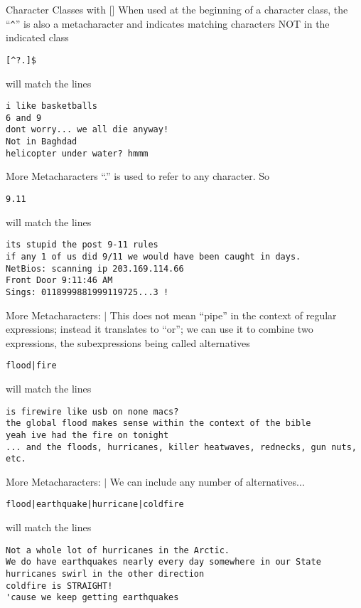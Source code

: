 \documentclass[aspectratio=169]{beamer}
\begin{document}
\begin{frame}[fragile]{Character Classes with []}
When used at the beginning of a character class, the ``\verb+^+'' is also a 
metacharacter and indicates matching characters NOT in the 
indicated class
\begin{verbatim}
[^?.]$
\end{verbatim}
will match the lines 
\begin{verbatim}
i like basketballs 
6 and 9
dont worry... we all die anyway! 
Not in Baghdad
helicopter under water? hmmm
\end{verbatim}
\end{frame}

\begin{frame}[fragile]{More Metacharacters}
``.'' is used to refer to any character. So
\begin{verbatim}
9.11
\end{verbatim}
will match the lines 
\begin{verbatim}
its stupid the post 9-11 rules 
if any 1 of us did 9/11 we would have been caught in days.
NetBios: scanning ip 203.169.114.66
Front Door 9:11:46 AM
Sings: 0118999881999119725...3 !
\end{verbatim}
\end{frame}

\begin{frame}[fragile]{More Metacharacters: $|$}
This does not mean ``pipe'' in the context of regular expressions;
instead it translates to ``or''; we can use it to combine two
expressions, the subexpressions being called alternatives
\begin{verbatim}
flood|fire
\end{verbatim}
will match the lines 
\begin{verbatim}
is firewire like usb on none macs? 
the global flood makes sense within the context of the bible 
yeah ive had the fire on tonight 
... and the floods, hurricanes, killer heatwaves, rednecks, gun nuts, etc. 
\end{verbatim}
\end{frame}

\begin{frame}[fragile]{More Metacharacters: $|$}
We can include any number of alternatives...
\begin{verbatim}
flood|earthquake|hurricane|coldfire
\end{verbatim}
will match the lines 
\begin{verbatim}
Not a whole lot of hurricanes in the Arctic.
We do have earthquakes nearly every day somewhere in our State 
hurricanes swirl in the other direction 
coldfire is STRAIGHT! 
'cause we keep getting earthquakes
\end{verbatim}
\end{frame}
\end{document}
